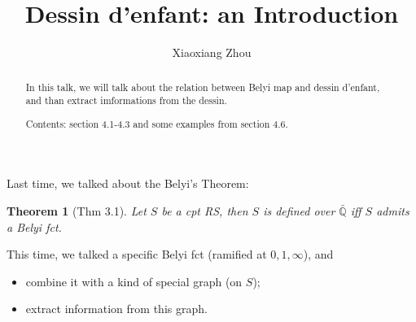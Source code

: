 \documentclass[reqno,11pt]{amsart}
\numberwithin{equation}{section}
\theoremstyle{plain}
\newtheorem{theorem}{Theorem}[section]
\theoremstyle{plain}
\numberwithin{equation}{section}
\theoremstyle{remark}
\begin{document}
\date{}

\title
{Dessin d'enfant: an Introduction}


\author{Xiaoxiang Zhou}
\address{School of Mathematical Sciences\\
University of Science and Technology of China\\
Hefei, 230026\\ P.R. China\\} 





\begin{abstract}
In this talk, we will talk about the relation between Belyi map and dessin d'enfant, and than extract imformations from the dessin.

Contents: section 4.1-4.3 and some examples from section 4.6.
\end{abstract}



\maketitle


 Last time, we talked about the Belyi's Theorem:
\begin{theorem}[Thm 3.1]
	Let $S$ be a cpt RS, then $S$ is defined over $\bar{\mathbb{Q}}$ iff $S$ admits a Belyi fct.
\end{theorem}
   
This time, we talked a specific Belyi fct (ramified at $0,1,\infty$), and
\begin{itemize}
	\item combine it with a kind of special graph (on $S$);
	\item extract information from this graph.
\end{itemize}
\end{document}
